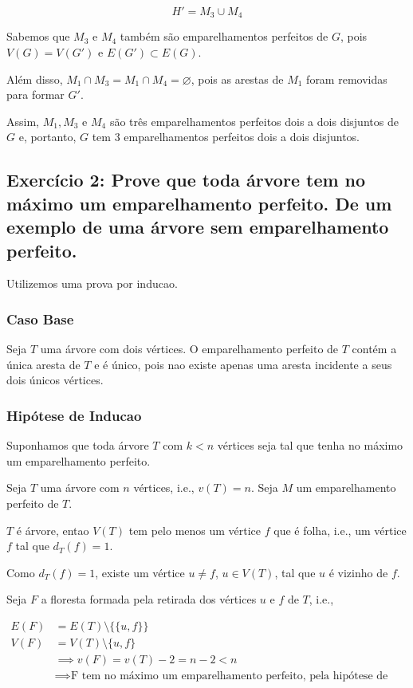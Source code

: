 \documentclass{article}
\begin{document}
 $$
 H' = M_3 \cup M_4
 $$
 
 Sabemos que $M_3$ e $M_4$ também são emparelhamentos perfeitos de $G$, pois $V(G) = V(G')$ e $E(G') \subset E(G)$.
 
 Além disso, $M_1 \cap M_3 = M_1 \cap M_4 = \varnothing$, pois as arestas de $M_1$ foram removidas para formar $G'$. 
 
 Assim, $M_1, M_3$ e $M_4$ são três emparelhamentos perfeitos dois a dois disjuntos de $G$ e, portanto, $G$ tem $3$ emparelhamentos perfeitos dois a dois disjuntos.
 
 \clearpage
 
 \subsection{Exercício 2:  Prove que toda árvore tem no máximo um emparelhamento perfeito. De um exemplo de uma árvore sem emparelhamento perfeito.}

Utilizemos uma prova por inducao.


  \subsubsection*{Caso Base}
  
  Seja $T$ uma árvore com dois vértices. O emparelhamento perfeito de $T$ contém a única aresta de $T$ e é único, pois nao existe apenas uma aresta incidente a seus dois únicos vértices.
  
  
  
  \subsubsection*{Hipótese de Inducao}
  
  Suponhamos que toda árvore $T$ com $k < n$ vértices seja tal que tenha no máximo um emparelhamento perfeito.
  
  Seja $T$ uma árvore com $n$ vértices, i.e., $v(T) = n$. Seja $M$ um emparelhamento perfeito de $T$.

 $T$ é árvore, entao $V(T)$ tem pelo menos um vértice $f$ que é folha, i.e., um vértice $f$ tal que $d_T(f) = 1$.
  
Como $d_T(f) = 1$, existe um vértice $u \neq f$, $u \in V(T)$, tal que $u$ é vizinho de $f$.
  
Seja $F$ a floresta formada pela retirada dos vértices $u$ e $f$ de $T$, i.e., 

\begin{align*}
	E(F) &=  E(T) \setminus  \{   \{u,f\}   \} \\
	V(F) &=  V(T) \setminus \{u,f\} \\
	&\implies v(F) = v(T) - 2 = n - 2 < n \\
	&\implies \text{F tem no máximo um emparelhamento perfeito, pela hipótese de inducao.}  \\
\end{align*}
\end{document}
